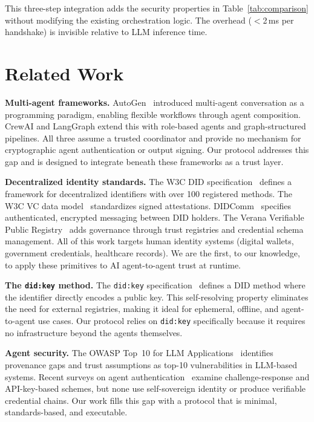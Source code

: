 \documentclass[11pt]{article}
\newcommand{\didkey}{\texttt{did:key}}
\begin{document}
This three-step integration adds the security properties in Table~\ref{tab:comparison} without modifying the existing orchestration logic. The overhead ($<$2\,ms per handshake) is invisible relative to LLM inference time.

\section{Related Work}

\textbf{Multi-agent frameworks.} AutoGen~\cite{wu2023autogen} introduced multi-agent conversation as a programming paradigm, enabling flexible workflows through agent composition. CrewAI and LangGraph extend this with role-based agents and graph-structured pipelines. All three assume a trusted coordinator and provide no mechanism for cryptographic agent authentication or output signing. Our protocol addresses this gap and is designed to integrate beneath these frameworks as a trust layer.

\textbf{Decentralized identity standards.} The W3C DID specification~\cite{w3cdid} defines a framework for decentralized identifiers with over 100 registered methods. The W3C VC data model~\cite{w3cvc} standardizes signed attestations. DIDComm~\cite{didcomm} specifies authenticated, encrypted messaging between DID holders. The Verana Verifiable Public Registry~\cite{verana_vpr} adds governance through trust registries and credential schema management. All of this work targets human identity systems (digital wallets, government credentials, healthcare records). We are the first, to our knowledge, to apply these primitives to AI agent-to-agent trust at runtime.

\textbf{The \didkey{} method.} The \didkey{} specification~\cite{didkey} defines a DID method where the identifier directly encodes a public key. This self-resolving property eliminates the need for external registries, making it ideal for ephemeral, offline, and agent-to-agent use cases. Our protocol relies on \didkey{} specifically because it requires no infrastructure beyond the agents themselves.

\textbf{Agent security.} The OWASP Top~10 for LLM Applications~\cite{owasp2025} identifies provenance gaps and trust assumptions as top-10 vulnerabilities in LLM-based systems. Recent surveys on agent authentication~\cite{agent_auth_survey} examine challenge-response and API-key-based schemes, but none use self-sovereign identity or produce verifiable credential chains. Our work fills this gap with a protocol that is minimal, standards-based, and executable.
\end{document}
